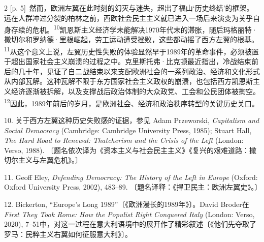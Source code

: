 \documentclass[10pt,a4paper]{article}
\begin{document}
\begin{paracol}{2}
{\scriptsize\color{gray} [p. 5]}\ 然而，欧洲左翼在此时刻的幻灭与迷失，超出了福山‘历史终结’的框架。远在人群冲过分裂的柏林之前，西欧社会民主主义就已进入一场后来演变为关乎自身存续的危\mbox{机。\textsuperscript{10}}凯恩斯主义经济学未能解决1970年代末的滞胀，随后玛格丽特·撒切尔和罗纳德·里根崛起，劳工运动遭受挫败，这些都动摇了西方左翼的根\mbox{基。\textsuperscript{11}}从这个意义上说，左翼历史性失败的体验显然早于1989年的革命事件，必须被置于超出国家社会主义崩溃的过程之中。克里斯托弗·比克顿最近指出，冷战结束前后的几十年，见证了自二战结束以来支配欧洲社会的一系列政治、经济和文化形式从内部瓦解。这种瓦解不限于东方国家社会主义政权的崩溃，也包括西方凯恩斯主义经济逐渐被拆解，以及支撑战后政治体制的大众政党、工会和公民团体被掏\mbox{空。\textsuperscript{12}}因此，1989年前后的岁月，是欧洲社会、经济和政治秩序转型的关键历史关口。\par{\small 10. 关于西方左翼这种历史失败感的证据，参见 Adam Przeworski, \textit{Capitalism and Social Democracy} (Cambridge: Cambridge University Press, 1985); Stuart Hall, \textit{The Hard Road to Renewal: Thatcherism and the Crisis of the Left} (London: Verso, 1988). 〔题名依次译为《资本主义与社会民主主义》《复兴的艰难道路：撒切尔主义与左翼危机》。〕\par}{\small 11. Geoff Eley, \textit{Defending Democracy: The History of the Left in Europe} (Oxford: Oxford University Press, 2002), 483–89. 〔题名译释：《捍卫民主：欧洲左翼史》。〕\par}{\small 12. Bickerton, “Europe’s Long 1989”〔《欧洲漫长的1989年》〕。David Broder在\textit{First They Took Rome: How the Populist Right Conquered Italy} (London: Verso, 2020), 7–51中，对这一过程在意大利语境中的展开作了精彩叙述〔《他们先夺取了罗马：民粹主义右翼如何征服意大利》〕。\par}
\switchcolumn

\end{paracol}
\end{document}
